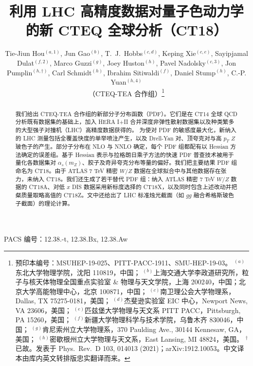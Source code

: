 \documentclass[11pt]{ctexart}
\begin{document}
\title{利用 LHC 高精度数据对量子色动力学的新 CTEQ 全球分析（CT18）}
\author{Tie-Jiun Hou$^{(a,1)}$, Jun Gao$^{(b)}$, T.~J.~Hobbs$^{(c,d)}$, Keping Xie$^{(c,e)}$, Sayipjamal Dulat$^{(f,2)}$, Marco Guzzi$^{(g)}$, Joey Huston$^{(h)}$, Pavel Nadolsky$^{(c,3)}$, Jon Pumplin$^{(h,\dag)}$, Carl Schmidt$^{(h)}$, Ibrahim Sitiwaldi$^{(f)}$, Daniel Stump$^{(h)}$, C.-P. Yuan$^{(h,4)}$\\[4pt]
（CTEQ-TEA 合作组）\footnote{预印本编号：MSUHEP-19-025、PITT-PACC-1911、SMU-HEP-19-03。
$^{(a)}$东北大学物理学院，沈阳 110819，中国；
$^{(b)}$上海交通大学李政道研究所，粒子与核天体物理全国重点实验室 \& 物理与天文学院，上海 200240，中国；北京大学高能物理中心，北京 100871，中国；
$^{(c)}$南卫理公会大学物理系，Dallas, TX 75275-0181，美国；
$^{(d)}$杰斐逊实验室 EIC 中心，Newport News, VA 23606，美国；
$^{(e)}$匹兹堡大学物理与天文系 PITT PACC，Pittsburgh, PA 15260，美国；
$^{(f)}$新疆大学物理科学与技术学院，乌鲁木齐 830046，中国；
$^{(g)}$肯尼索州立大学物理系，370 Paulding Ave., 30144 Kennesaw, GA，美国；
$^{(h)}$密歇根州立大学物理与天文系，East Lansing, MI 48824，美国。
$^{\dag}$已故。发表于 Phys.\ Rev.\ D 103, 014013 (2021)；arXiv:1912.10053。中文译本由库内英文转排版忠实翻译而来。}}
\date{}

\maketitle

\begin{abstract}
我们给出 CTEQ-TEA 合作组的新部分子分布函数（PDF）。它们是在 CT14 全球 QCD 分析既有数据集的基础上，加入 HERA I+II 合并深度非弹性散射数据集以及种类繁多的大型强子对撞机（LHC）高精度数据获得的。
为使对 PDF 的敏感度最大化，新纳入的 LHC 测量包括全覆盖快度的单举喷注产生，以及 Drell-Yan 对、顶夸克对与高 $p_T$ $Z$ 玻色子的产生。部分子分布在 NLO 与 NNLO 确定，每个 PDF 组都配有以 Hessian 方法确定的误差组。基于 Hessian 表示与拉格朗日乘子方法的快速 PDF 普查技术被用于量化各数据集对 $\alpha_s(m_Z)$、胶子及奇异夸克分布等量的偏好。我们把主要结果 PDF 组命名为 CT18。由于 ATLAS 7 TeV 精密 $W/Z$ 数据在全球拟合中与其他数据存在张力，未纳入 CT18。我们还生成了若干替代 PDF 组：纳入 ATLAS 精密 7 TeV $W/Z$ 数据的 CT18A、对低 $x$ DIS 数据采用新标度选择的 CT18X，以及同时包含上述改动并把粲质量取略高值的 CT18Z。文中还给出了 LHC 标准烛光截面（如 $gg$ 融合希格斯玻色子截面）的理论计算。
\end{abstract}

\medskip
\noindent PACS 编号：12.38.-t, 12.38.Bx, 12.38.Aw

\tableofcontents
\newpage











\end{document}
